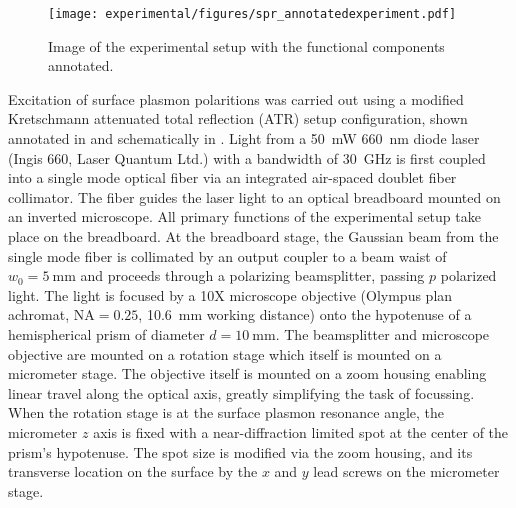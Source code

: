 \begin{figure}[ht]
 \centering
 \texttt{[image: experimental/figures/spr\_annotatedexperiment.pdf]}
 \caption{Image of the experimental setup with the functional
  components annotated.}
\label{fig:experimentalpicture}
\end{figure}

Excitation of surface plasmon polaritions was carried out using a modified
Kretschmann attenuated total reflection (ATR) setup configuration, shown
annotated in  and schematically in
.  Light from a \SI{50}{\milli\watt}
\SI{660}{\nano\meter} diode laser (Ingis 660, Laser Quantum Ltd.) with
a bandwidth of \SI{30}{\giga\hertz} is first coupled into a single mode
optical fiber via an integrated air-spaced doublet fiber collimator.  The
fiber guides the laser light to an optical breadboard mounted on an inverted
microscope.  All primary functions of the experimental setup take place on the
breadboard.  At the breadboard stage, the Gaussian beam from the single mode
fiber is collimated by an output coupler to a beam waist of
$w_0=\SI{5}{\milli\meter}$ and proceeds through a polarizing beamsplitter,
passing $p$ polarized light.  The light is focused by a 10X microscope
objective (Olympus plan achromat, $\mathrm{NA}=0.25$, \SI{10.6}{\milli\meter}
working distance) onto the hypotenuse of a hemispherical prism of diameter
$d=\SI{10}{\milli\meter}$.  The beamsplitter and microscope objective are
mounted on a rotation stage which itself is mounted on a micrometer stage.
The objective itself is mounted on a zoom housing enabling linear travel along
the optical axis, greatly simplifying the task of focussing.  When the
rotation stage is at the surface plasmon resonance angle, the micrometer $z$
axis is fixed with a near-diffraction limited spot at the center of the
prism's hypotenuse.  The spot size is modified via the zoom housing, and its
transverse location on the surface by the $x$ and $y$ lead screws on the
micrometer stage.

